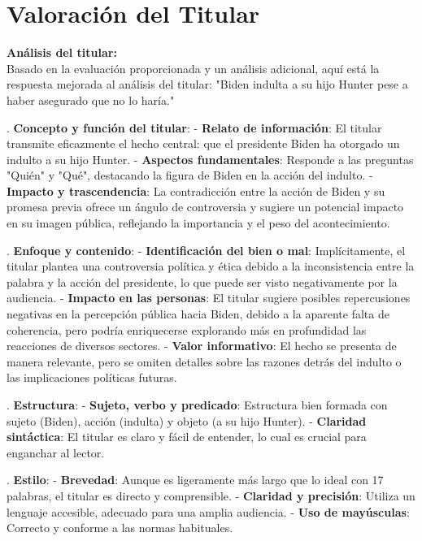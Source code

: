 \documentclass[10pt,a4paper]{article}
\begin{document}
\section*{Valoración del Titular}
        \textbf{Análisis del titular:} \\ 
        Basado en la evaluaci\'{o}n proporcionada y un an\'{a}lisis adicional, aqu\'{i} est\'{a} la respuesta mejorada al an\'{a}lisis del titular: "Biden indulta a su hijo Hunter pese a haber asegurado que no lo har\'{i}a."
\par{}. \textbf{Concepto y funci\'{o}n del titular}:    - \textbf{Relato de informaci\'{o}n}: El titular transmite eficazmente el hecho central: que el presidente Biden ha otorgado un indulto a su hijo Hunter.     - \textbf{Aspectos fundamentales}: Responde a las preguntas "Qui\'{e}n" y "Qu\'{e}", destacando la figura de Biden en la acci\'{o}n del indulto.    - \textbf{Impacto y trascendencia}: La contradicci\'{o}n entre la acci\'{o}n de Biden y su promesa previa ofrece un \'{a}ngulo de controversia y sugiere un potencial impacto en su imagen p\'{u}blica, reflejando la importancia y el peso del acontecimiento.
\par{}. \textbf{Enfoque y contenido}:    - \textbf{Identificaci\'{o}n del bien o mal}: Impl\'{i}citamente, el titular plantea una controversia pol\'{i}tica y \'{e}tica debido a la inconsistencia entre la palabra y la acci\'{o}n del presidente, lo que puede ser visto negativamente por la audiencia.    - \textbf{Impacto en las personas}: El titular sugiere posibles repercusiones negativas en la percepci\'{o}n p\'{u}blica hacia Biden, debido a la aparente falta de coherencia, pero podr\'{i}a enriquecerse explorando m\'{a}s en profundidad las reacciones de diversos sectores.    - \textbf{Valor informativo}: El hecho se presenta de manera relevante, pero se omiten detalles sobre las razones detr\'{a}s del indulto o las implicaciones pol\'{i}ticas futuras.
\par{}. \textbf{Estructura}:    - \textbf{Sujeto, verbo y predicado}: Estructura bien formada con sujeto (Biden), acci\'{o}n (indulta) y objeto (a su hijo Hunter).    - \textbf{Claridad sint\'{a}ctica}: El titular es claro y f\'{a}cil de entender, lo cual es crucial para enganchar al lector.
\par{}. \textbf{Estilo}:    - \textbf{Brevedad}: Aunque es ligeramente m\'{a}s largo que lo ideal con 17 palabras, el titular es directo y comprensible.    - \textbf{Claridad y precisi\'{o}n}: Utiliza un lenguaje accesible, adecuado para una amplia audiencia.    - \textbf{Uso de may\'{u}sculas}: Correcto y conforme a las normas habituales.
\end{document}
